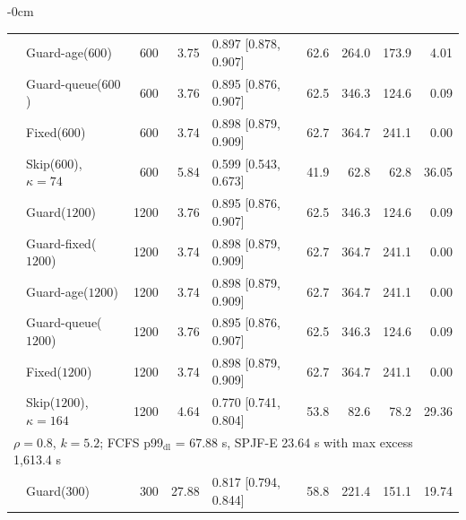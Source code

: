 \documentclass[mathematics,supfile,submit,moreauthors]{Definitions/mdpi}
\newcommand{\sealednum}[1]{#1}
\begin{document}
\begin{table}[htbp]
\begin{adjustwidth}{-\extralength}{0cm}
\begin{tabular}{llrrlrrrr}
 & Guard-age($\sealednum{600}$)  & \sealednum{600} & \sealednum{3.75} & \sealednum{0.897 [0.878, 0.907]} & \sealednum{62.6} & \sealednum{264.0} & \sealednum{173.9} & \sealednum{4.01} \\
 & Guard-queue($\sealednum{600}$) & \sealednum{600} & \sealednum{3.76} & \sealednum{0.895 [0.876, 0.907]} & \sealednum{62.5} & \sealednum{346.3} & \sealednum{124.6} & \sealednum{0.09} \\
 & Fixed($\sealednum{600}$)      & \sealednum{600} & \sealednum{3.74} & \sealednum{0.898 [0.879, 0.909]} & \sealednum{62.7} & \sealednum{364.7} & \sealednum{241.1} & \sealednum{0.00} \\
 & Skip($\sealednum{600}$), $\kappa=74$ & \sealednum{600} & \sealednum{5.84} & \sealednum{0.599 [0.543, 0.673]} & \sealednum{41.9} & \sealednum{62.8} & \sealednum{62.8} & \sealednum{36.05} \\
 & Guard($\sealednum{1200}$)     & \sealednum{1200} & \sealednum{3.76} & \sealednum{0.895 [0.876, 0.907]} & \sealednum{62.5} & \sealednum{346.3} & \sealednum{124.6} & \sealednum{0.09} \\
 & Guard-fixed($\sealednum{1200}$) & \sealednum{1200} & \sealednum{3.74} & \sealednum{0.898 [0.879, 0.909]} & \sealednum{62.7} & \sealednum{364.7} & \sealednum{241.1} & \sealednum{0.00} \\
 & Guard-age($\sealednum{1200}$) & \sealednum{1200} & \sealednum{3.74} & \sealednum{0.898 [0.879, 0.909]} & \sealednum{62.7} & \sealednum{364.7} & \sealednum{241.1} & \sealednum{0.00} \\
 & Guard-queue($\sealednum{1200}$) & \sealednum{1200} & \sealednum{3.76} & \sealednum{0.895 [0.876, 0.907]} & \sealednum{62.5} & \sealednum{346.3} & \sealednum{124.6} & \sealednum{0.09} \\
 & Fixed($\sealednum{1200}$)     & \sealednum{1200} & \sealednum{3.74} & \sealednum{0.898 [0.879, 0.909]} & \sealednum{62.7} & \sealednum{364.7} & \sealednum{241.1} & \sealednum{0.00} \\
 & Skip($\sealednum{1200}$), $\kappa=164$ & \sealednum{1200} & \sealednum{4.64} & \sealednum{0.770 [0.741, 0.804]} & \sealednum{53.8} & \sealednum{82.6} & \sealednum{78.2} & \sealednum{29.36} \\
\midrule
\multicolumn{9}{l}{$\rho = \sealednum{0.8}$, $k = \sealednum{5.2}$; FCFS p99$_{\mathrm{dl}}$ = \sealednum{67.88} s, SPJF-E \sealednum{23.64} s with max excess \sealednum{1{,}613.4} s} \\
 & Guard($\sealednum{300}$)      & \sealednum{300} & \sealednum{27.88} & \sealednum{0.817 [0.794, 0.844]} & \sealednum{58.8} & \sealednum{221.4} & \sealednum{151.1} & \sealednum{19.74} \\

\end{tabular}
\end{adjustwidth}
\end{table}
\end{document}

